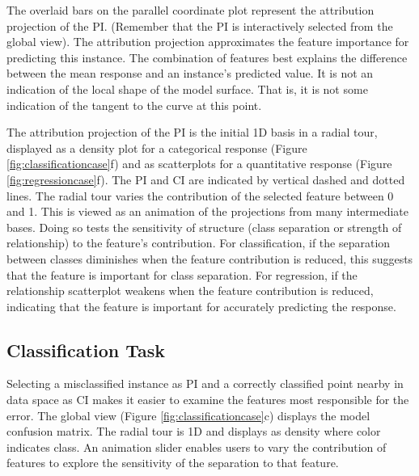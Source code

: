 \documentclass[11pt,twoside]{article}
\begin{document}
The overlaid bars on the parallel coordinate plot represent the attribution projection of the PI. (Remember that the PI is interactively selected from the global view). The attribution projection approximates the feature importance for predicting this instance. The combination of features best explains the difference between the mean response and an instance's predicted value. It is not an indication of the local shape of the model surface. That is, it is not some indication of the tangent to the curve at this point.

The attribution projection of the PI is the initial 1D basis in a radial tour, displayed as a density plot for a categorical response (Figure \ref{fig:classificationcase}f) and as scatterplots for a quantitative response (Figure \ref{fig:regressioncase}f). The PI and CI are indicated by vertical dashed and dotted lines. The radial tour varies the contribution of the selected feature between 0 and 1. This is viewed as an animation of the projections from many intermediate bases. Doing so tests the sensitivity of structure (class separation or strength of relationship) to the feature's contribution. For classification, if the separation between classes diminishes when the feature contribution is reduced, this suggests that the feature is important for class separation. For regression, if the relationship scatterplot weakens when the feature contribution is reduced, indicating that the feature is important for accurately predicting the response.

\hypertarget{classification-task}{%
\subsection{Classification Task}\label{classification-task}}

Selecting a misclassified instance as PI and a correctly classified point nearby in data space as CI makes it easier to examine the features most responsible for the error. The global view (Figure \ref{fig:classificationcase}c) displays the model confusion matrix. The radial tour is 1D and displays as density where color indicates class. An animation slider enables users to vary the contribution of features to explore the sensitivity of the separation to that feature.
\end{document}

